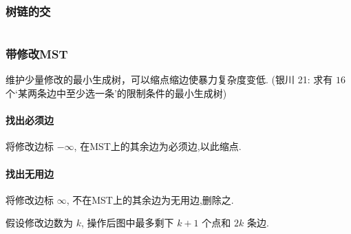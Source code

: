 \subsubsection{树链的交}
	\inputminted{cpp}{src/yzh/path_inter.cpp}

\subsubsection{带修改MST}
    维护少量修改的最小生成树，可以缩点缩边使暴力复杂度变低. (银川 21: 求有 $16$ 个`某两条边中至少选一条'的限制条件的最小生成树) 
    \paragraph{找出必须边}将修改边标 $-\infty$, 在MST上的其余边为必须边,以此缩点.
    \paragraph{找出无用边}将修改边标 $\infty$, 不在MST上的其余边为无用边,删除之. 

    假设修改边数为 $k$, 操作后图中最多剩下 $k+1$ 个点和 $2k$ 条边.
    

